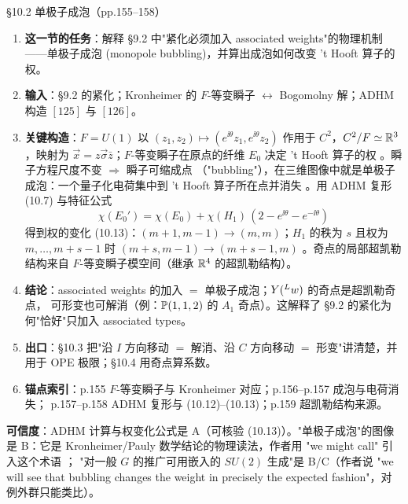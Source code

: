 \begin{kcard}{\S10.2 单极子成泡（pp.155--158）}
\begin{enumerate}[label=\textbf{\arabic*}]
\item \textbf{这一节的任务}：解释 \S9.2 中"紧化必须加入 associated weights"的物理机制——单极子成泡
  (monopole bubbling)，并算出成泡如何改变 't Hooft 算子的权。
\item \textbf{输入}：\S9.2 的紧化；Kronheimer 的 $F$-等变瞬子 $\leftrightarrow$ Bogomolny 解；ADHM 构造
  $[125]$ 与 $[126]$。
\item \textbf{关键构造}：$F=U(1)$ 以 $(z_1,z_2)\mapsto(e^{\ii\theta}z_1,e^{\ii\theta}z_2)$ 作用于
  $C^2$，$C^2/F\simeq\mathbb{R}^3$，映射为 $\vec x=z\vec\sigma\bar z$；$F$-等变瞬子在原点的纤维
  $E_0$ 决定 't Hooft 算子的权 \pA{}。瞬子方程尺度不变 $\Rightarrow$ 瞬子可缩成点
  （"bubbling"），在三维图像中就是单极子成泡：一个量子化电荷集中到 't Hooft 算子所在点并消失
  \pA{}。用 ADHM 复形 (10.7) 与特征公式
\begin{equation}
\chi(E_0')=\chi(E_0)+\chi(H_1)\,(2-e^{\ii\theta}-e^{-\ii\theta})
\label{eq:geom-bubbling}
\end{equation}
  得到权的变化 (10.13)：$(m+1,m-1)\to(m,m)$；$H_1$ 的秩为 $s$ 且权为 $m,\dots,m+s-1$ 时
  $(m+s,m-1)\to(m+s-1,m)$ \pA{}。奇点的局部超凯勒结构来自
  $F$-等变瞬子模空间（继承 $\mathbb{R}^4$ 的超凯勒结构）\pA{}。
\item \textbf{结论}：associated weights 的加入 $=$ 单极子成泡；$Y({}^{L}w)$ 的奇点是超凯勒奇点，
  可形变也可解消（例：$\mathbb{P}(1,1,2)$ 的 $A_1$ 奇点）。这解释了 \S9.2 的紧化为何"恰好"只加入
  associated types。
\item \textbf{出口}：\S10.3 把"沿 $I$ 方向移动 $=$ 解消、沿 $C$ 方向移动 $=$ 形变"讲清楚，并用于
  OPE 极限；\S10.4 用奇点算系数。
\item \textbf{锚点索引}：p.155 $F$-等变瞬子与 Kronheimer 对应；p.156--p.157 成泡与电荷消失；
  p.157--p.158 ADHM 复形与 (10.12)--(10.13)；p.159 超凯勒结构来源。
\end{enumerate}
\textbf{可信度}：ADHM 计算与权变化公式是 A（可核验 (10.13)）。"单极子成泡"的图像是 B：它是
Kronheimer/Pauly 数学结论的物理读法，作者用 "we might call" 引入这个术语 \pB{}；
"对一般 $G$ 的推广可用嵌入的 $SU(2)$ 生成"是 B/C（作者说 "we will see that bubbling changes the
weight in precisely the expected fashion"，对例外群只能类比）\pC{}。
\end{kcard}

